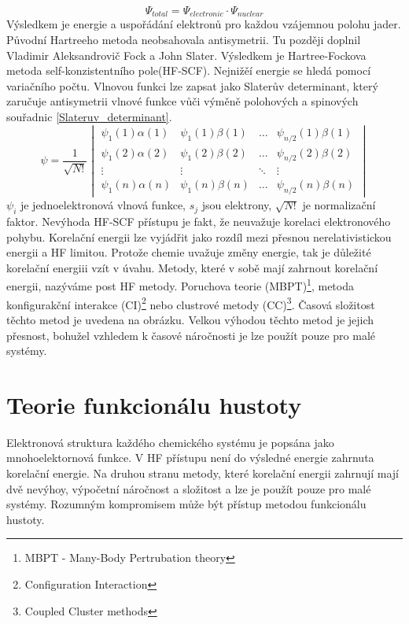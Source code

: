 \documentclass[
  digital, %
  table,   %
  lof,     %
  lot,     %
]{fithesis3}
\begin{document}
\begin{equation}
  \Psi_{total} = \Psi_{electronic} \cdot \Psi_{nuclear}
  \label{B_O_approximace}
\end{equation}
Výsledkem je energie a uspořádání elektronů pro každou vzájemnou polohu jader. Původní Hartreeho metoda neobsahovala antisymetrii. Tu později doplnil Vladimir Aleksandrovič Fock a John Slater. Výsledkem je Hartree-Fockova metoda self-konzistentního pole(HF-SCF). Nejnižěí energie se hledá pomocí variačního počtu. Vlnovou funkci lze zapsat jako Slaterův determinant, který zaručuje antisymetrii vlnové funkce vůči výměně polohových a spinových souřadnic \ref{Slateruv_determinant}.
\begin{equation}
\psi =  \frac{1}{\sqrt{N!}}\begin{vmatrix}
\psi_1(1)\alpha(1) & \psi_1(1) \beta (1)  & \dots & \psi_{n/2}(1)\beta(1) \\
\psi_1(2)\alpha(2) & \psi_1(2) \beta (2) & \dots & \psi_{n/2}(2)\beta(2) \\
\vdots             & \vdots                           & \ddots & \vdots \\
\psi_1(n)\alpha(n) & \psi_1(n) \beta (n) & \dots & \psi_{n/2}(n)\beta(n)
\end{vmatrix}
\label{Slateruv_determinant}
\end{equation}
$\psi_i$ je jednoelektronová vlnová funkce, $s_j$ jsou elektrony, $\sqrt{N!}$ je normalizační faktor.
 Nevýhoda HF-SCF přístupu je fakt, že neuvažuje korelaci elektronového pohybu. Korelační energii lze vyjádřit jako rozdíl mezi přesnou nerelativistickou energii a HF limitou. Protože chemie uvažuje změny energie, tak je důležité korelační energiii vzít v úvahu.
Metody, které v sobě mají zahrnout korelační energii, nazýváme post HF metody. Poruchova teorie (MBPT)\footnote{MBPT - Many-Body Pertrubation theory}, metoda konfigurakční interakce (CI)\footnote{Configuration Interaction} nebo clustrové metody (CC)\footnote{Coupled
Cluster methods}. Časová složitost těchto metod je uvedena na obrázku. Velkou výhodou těchto metod je jejich přesnost, bohužel vzhledem k časové náročnosti je lze použít pouze pro malé systémy.


\section{Teorie funkcionálu hustoty}
Elektronová struktura každého chemického systému je popsána jako mnohoelektornová funkce. V HF přístupu není do výsledné energie zahrnuta korelační energie. Na druhou stranu metody, které korelační energii zahrnují mají dvě nevýhoy, výpočetní náročnost a složitost a lze je použít pouze pro malé systémy. Rozumným kompromisem může být přístup metodou funkcionálu hustoty. \\
\end{document}
